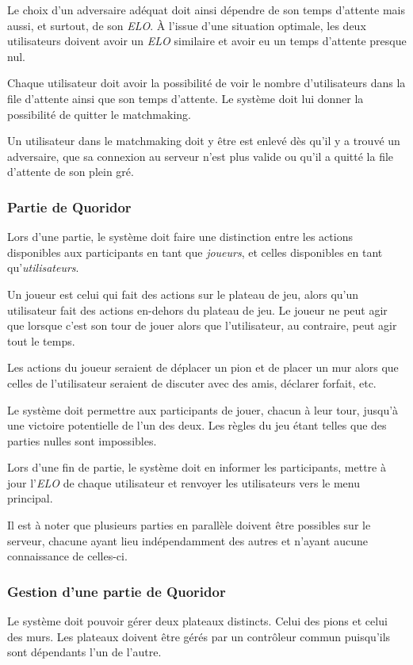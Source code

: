 Le choix d'un adversaire adéquat doit ainsi dépendre de son temps
d'attente mais aussi, et surtout, de son \emph{ELO}.
À l'issue d'une situation optimale, les deux utilisateurs doivent
avoir un \emph{ELO} similaire et avoir eu un temps d'attente presque
nul.

Chaque utilisateur doit avoir la possibilité de voir le nombre d'utilisateurs
dans la file d'attente ainsi que son temps d'attente. Le
système doit lui donner la possibilité de quitter le
matchmaking.

Un utilisateur dans le matchmaking doit y être est enlevé
dès qu'il y a trouvé un adversaire, que sa connexion au
serveur n'est plus valide ou qu'il a quitté la file
d'attente de son plein gré.

\subsubsection{Partie de Quoridor}

Lors d'une partie, le système doit faire une distinction
entre les actions disponibles aux participants en tant que
\emph{joueurs}, et
celles disponibles en tant qu'\emph{utilisateurs}.

Un joueur est celui qui fait des actions sur le
plateau de jeu, alors qu'un utilisateur fait des
actions en-dehors du plateau de jeu. Le joueur ne peut agir
que lorsque c'est son tour de jouer alors que l'utilisateur, au
contraire, peut agir tout le temps.

Les actions du joueur seraient de déplacer un pion
et de placer un mur alors que celles de l'utilisateur
seraient de discuter avec des amis, déclarer forfait,
etc.

Le système doit permettre aux participants de jouer,
chacun à leur tour, jusqu'à une victoire potentielle
de l'un des deux. Les règles du jeu étant telles que
des parties nulles sont impossibles.

Lors d'une fin de partie, le système doit en informer les
participants, mettre à jour l'\emph{ELO} de chaque
utilisateur et renvoyer les utilisateurs vers le menu principal.

Il est à noter que plusieurs parties en parallèle doivent être
possibles sur le serveur, chacune ayant lieu indépendamment des
autres et n'ayant aucune connaissance de celles-ci.

\subsubsection{Gestion d'une partie de Quoridor}

Le système doit pouvoir gérer deux plateaux distincts.
Celui des pions et celui des murs. Les plateaux
doivent être gérés par un contrôleur commun puisqu'ils
sont dépendants l'un de l'autre.




